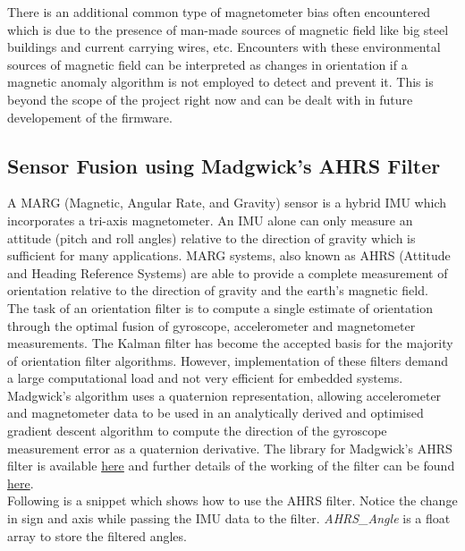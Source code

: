 \documentclass[a4paper,12pt,oneside]{book}
\begin{document}
\bigskip

There is an additional common type of magnetometer bias often encountered which is due to the presence of man-made sources of magnetic field like big steel buildings and current carrying wires, etc. Encounters with these environmental sources of magnetic field can be interpreted as changes in orientation if a magnetic anomaly algorithm is not employed to detect and prevent it. This is beyond the scope of the project right now and can be dealt with in future developement of the firmware. \cite{kris}

\subsection{Sensor Fusion using Madgwick's AHRS Filter}
A MARG (Magnetic, Angular Rate, and Gravity) sensor is a hybrid IMU which incorporates a tri-axis magnetometer. An IMU alone can only measure an attitude (pitch and roll angles) relative to the direction of gravity which is sufficient for many applications. MARG systems, also known as AHRS (Attitude and Heading Reference Systems) are able to provide a complete measurement of orientation relative to the direction of gravity and the earth's magnetic field.\cite{madgwick}\\

The task of an orientation filter is to compute a single estimate of orientation through the optimal fusion of gyroscope, accelerometer and magnetometer measurements. The Kalman filter has become the accepted basis for the majority of orientation filter algorithms. However, implementation of these filters demand a large computational load and not very efficient for embedded systems.\cite{madgwick}\\

Madgwick's algorithm uses a quaternion representation, allowing accelerometer and magnetometer data to be used in an analytically derived and optimised gradient descent algorithm to compute the direction of the gyroscope measurement error as a quaternion derivative. The library for Madgwick's AHRS filter is available \href{http://x-io.co.uk/open-source-imu-and-ahrs-algorithms/}{here} and further details of the working of the filter can be found \href{./datasheets/Madgwick Internal Report.pdf}{here}.\cite{madgwick}\\

Following is a snippet which shows how to use the AHRS filter. Notice the change in sign and axis while passing the IMU data to the filter. \textit{AHRS{\_}Angle} is a float array to store the filtered angles.\\
\end{document}
